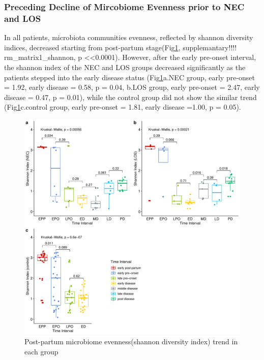 \documentclass[fleqn,10pt,lineno]{wlpeerj} %
\begin{document}
    \subsubsection*{Preceding Decline of Mircobiome Evenness prior to NEC and LOS}
    In all patients, microbiota communities evenness, reflected by shannon diversity indices, decreased starting from post-partum stage(Fig\ref{fig:shannon-group-time}, supplemantary!!!! rm\_matrix1\_shannon, p \textless <0.0001). However, after the early pre-onset interval, the shannon index of the NEC and LOS groups decreased significantly as the patients stepped into the early disease status (Fig\ref{fig:shannon-group-time}a.NEC group, early pre-onset = 1.92, early disease = 0.58, p = 0.04, b.LOS group, early pre-onset = 2.47, early disease = 0.47, p = 0.01), while the control group did not show the similar trend (Fig\ref{fig:shannon-group-time}c.control group, early pre-onset = 1.81, early disease =1.00, p = 0.05).
    \begin{figure}[ht]\centering
      \includegraphics[width=\linewidth]{figure/shannon-group-time.pdf}
      \caption{Post-partum microbiome evenness(shannon diversity index) trend in each group}
      \label{fig:shannon-group-time}
    \end{figure}
\end{document}
